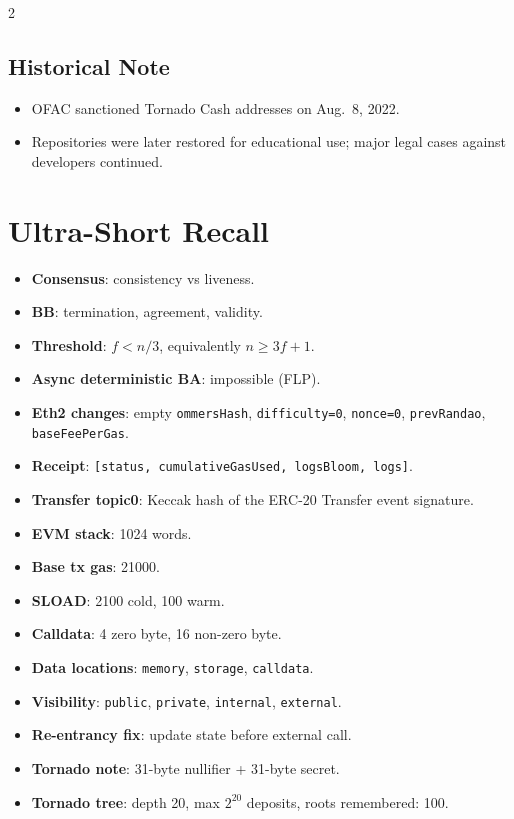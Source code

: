 \documentclass[10pt,a4paper]{article}
\newcommand{\code}[1]{\texttt{#1}}
\newcommand{\imp}[1]{\textbf{#1}}
\begin{document}
\begin{multicols*}{2}
\subsection*{Historical Note}
\begin{itemize}
\item OFAC sanctioned Tornado Cash addresses on Aug.\ 8, 2022.
\item Repositories were later restored for educational use; major legal cases against developers continued.
\end{itemize}

\section*{Ultra-Short Recall}
\begin{itemize}
\item \imp{Consensus}: consistency vs liveness.
\item \imp{BB}: termination, agreement, validity.
\item \imp{Threshold}: $f < n/3$, equivalently $n \ge 3f+1$.
\item \imp{Async deterministic BA}: impossible (FLP).
\item \imp{Eth2 changes}: empty \code{ommersHash}, \code{difficulty=0}, \code{nonce=0}, \code{prevRandao}, \code{baseFeePerGas}.
\item \imp{Receipt}: \code{[status, cumulativeGasUsed, logsBloom, logs]}.
\item \imp{Transfer topic0}: Keccak hash of the ERC-20 Transfer event signature.
\item \imp{EVM stack}: 1024 words.
\item \imp{Base tx gas}: 21000.
\item \imp{SLOAD}: 2100 cold, 100 warm.
\item \imp{Calldata}: 4 zero byte, 16 non-zero byte.
\item \imp{Data locations}: \code{memory}, \code{storage}, \code{calldata}.
\item \imp{Visibility}: \code{public}, \code{private}, \code{internal}, \code{external}.
\item \imp{Re-entrancy fix}: update state before external call.
\item \imp{Tornado note}: 31-byte nullifier + 31-byte secret.
\item \imp{Tornado tree}: depth 20, max $2^{20}$ deposits, roots remembered: 100.
\end{itemize}

\end{multicols*}
\end{document}

